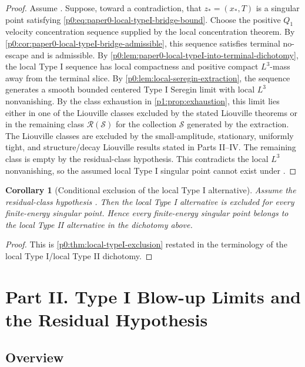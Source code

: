 \documentclass[11pt]{amsart}
\theoremstyle{plain}
\newtheorem{corollary}[corollary]{Corollary}
\theoremstyle{definition}
\theoremstyle{remark}
\numberwithin{equation}{section}
\newcommand{\calS}{\mathcal S}
\newcommand{\calR}{\mathcal R}
\begin{document}
\begin{proof}
Assume .
Suppose, toward a contradiction, that \(z_*=(x_*,T)\) is a singular point
satisfying \eqref{p0:eq:paper0-local-typeI-bridge-bound}.
Choose the positive \(Q_1\) velocity concentration sequence supplied by the
local concentration theorem.  By
\cref{p0:cor:paper0-local-typeI-bridge-admissible}, this sequence satisfies
terminal no-escape and is admissible.
By \cref{p0:lem:paper0-local-typeI-into-terminal-dichotomy}, the local Type I
sequence has local compactness and positive compact \(L^3\)-mass away from the
terminal slice.
By \cref{p0:lem:local-seregin-extraction}, the sequence generates a smooth
bounded centered Type I Seregin limit with local \(L^3\) nonvanishing.  By the
class exhaustion in
\cref{p1:prop:exhaustion}, this limit lies either in one of the Liouville
classes excluded by the stated Liouville theorems or in the remaining class \(\calR(\calS)\) for the
collection \(\calS\) generated by the extraction.  The Liouville classes are
excluded by the small-amplitude, stationary, uniformly tight, and
structure/decay Liouville results stated in Parts II--IV.  The remaining
class is empty by the residual-class hypothesis.  This contradicts the
local \(L^3\) nonvanishing, so the assumed local Type I singular point
cannot exist under .
\end{proof}

\begin{corollary}[Conditional exclusion of the local Type I alternative]
\label{p0:cor:paper0-local-typeII-after-bridge}
Assume the residual-class hypothesis .  Then the
local Type I alternative is excluded for every finite-energy singular point.
Hence every finite-energy singular point belongs to the local Type II
alternative in the dichotomy above.
\end{corollary}

\begin{proof}
This is \cref{p0:thm:local-typeI-exclusion} restated in the terminology
of the local Type I/local Type II dichotomy.
\end{proof}



\clearpage
\section*{Part II. Type I Blow-up Limits and the Residual Hypothesis}

\subsection*{Overview}
\end{document}
